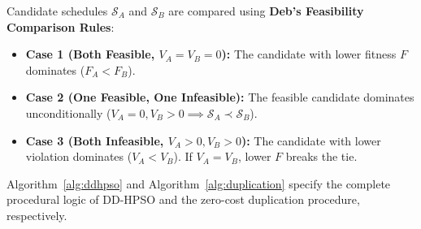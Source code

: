 \documentclass[journal]{IEEEtran}
\begin{document}
Candidate schedules $\mathcal{S}_A$ and $\mathcal{S}_B$ are compared using \textbf{Deb's Feasibility Comparison Rules}:
\begin{itemize}
    \item \textbf{Case 1 (Both Feasible, $V_A = V_B = 0$):} The candidate with lower fitness $F$ dominates ($F_A < F_B$).
    \item \textbf{Case 2 (One Feasible, One Infeasible):} The feasible candidate dominates unconditionally ($V_A = 0, V_B > 0 \implies \mathcal{S}_A \prec \mathcal{S}_B$).
    \item \textbf{Case 3 (Both Infeasible, $V_A > 0, V_B > 0$):} The candidate with lower violation dominates ($V_A < V_B$). If $V_A = V_B$, lower $F$ breaks the tie.
\end{itemize}

Algorithm~\ref{alg:ddhpso} and Algorithm~\ref{alg:duplication} specify the complete procedural logic of DD-HPSO and the zero-cost duplication procedure, respectively.
\end{document}
